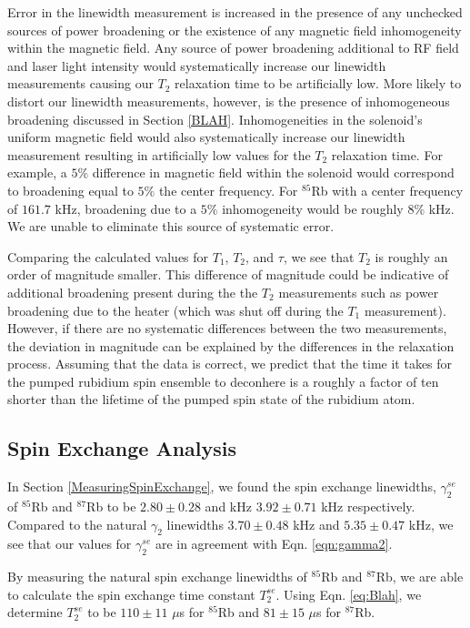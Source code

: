 Error in the linewidth measurement is increased in the presence of any unchecked sources of power broadening or the existence of any magnetic field inhomogeneity within the magnetic field.  Any source of power broadening additional to RF field and laser light intensity would systematically increase our linewidth measurements causing our $T_2$ relaxation time to be artificially low.  More likely to distort our linewidth measurements, however, is the presence of inhomogeneous broadening discussed in Section \ref{BLAH}.  Inhomogeneities in the solenoid's uniform magnetic field would also systematically increase our linewidth measurement resulting in artificially low values for the $T_2$ relaxation time.  For example, a $5\%$ difference in magnetic field within the solenoid would correspond to broadening equal to $5\%$ the center frequency.  For $^{85}$Rb with a center frequency of $161.7$ kHz, broadening due to a $5\%$ inhomogeneity would be roughly $8\%$ kHz. We are unable to eliminate this source of systematic error.

Comparing the calculated values for $T_1$, $T_2$, and $\tau$, we see that $T_2$ is roughly an order of magnitude smaller.  This difference of magnitude could be indicative of additional broadening present during the the $T_2$ measurements such as power broadening due to the heater (which was shut off during the $T_1$ measurement).  However, if there are no systematic differences between the two measurements, the deviation in magnitude can be explained by the differences in the relaxation process.  Assuming that the data is correct, we predict that the time it takes for the pumped rubidium spin ensemble to deconhere is a roughly a factor of ten shorter than the lifetime of the pumped spin state of the rubidium atom. 


\subsection{Spin Exchange Analysis}\label{SpinExchangeAnalysis}

In Section \ref{MeasuringSpinExchange}, we found the spin exchange linewidths, $\gamma^{se}_2$ of $^{85}$Rb and $^{87}$Rb to be $2.80 \pm 0.28$ and kHz $3.92 \pm 0.71$ kHz respectively. Compared to the natural $\gamma_2$ linewidths $3.70 \pm 0.48$  kHz  and $5.35 \pm 0.47$ kHz, we see that our values for $\gamma^{se}_2$ are in agreement with Eqn. \ref{eqn:gamma2}.

By measuring the natural spin exchange linewidths of $^{85}$Rb and $^{87}$Rb, we are able to calculate the spin exchange time constant $T^{se}_2$.  Using Eqn. \ref{eq:Blah}, we determine $T^{se}_2$ to be $110 \pm 11$ $\mu$s for  $^{85}$Rb and $81 \pm 15$ $\mu$s for  $^{87}$Rb. 

